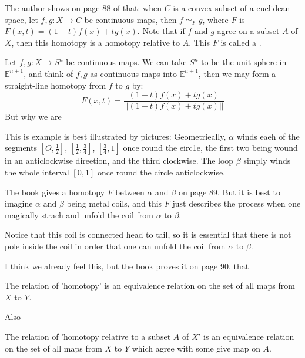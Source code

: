 \begin{ex}
    The author shows on page 88 of \cite{book} that: when $C$ is a
    convex subset of a euclidean space, let $f,g:X\to C$ be continuous
    maps, then $f\simeq_F g$, where $F$ is $F(x,t)=(1-t)f(x)+tg(x)$.
    Note that if $f$ and $g$ agree on a subset $A$ of $X$, then this
    homotopy is a homotopy relative to $A$. This $F$ is called a
    .
\end{ex}
\begin{ex}
    Let $f,g:X\to S^n$ be continuous maps. We can take $S^n$ to be the
    unit sphere in $\mathbb{E}^{n+1}$, and think of $f,g$ as
    continuous maps into $\mathbb{E}^{n+1}$, then we may form a
    straight-line homotopy from $f$ to $g$ by:
    \begin{equation}
        F(x,t) = \frac{(1-t)f(x)+tg(x)}{||(1-t)f(x)+tg(x)||}
    \end{equation}
    But why we are  %
\end{ex}
\begin{ex}
    This is example is best illustrated by pictures:
    Geometrieally, $\alpha$ winds eaeh of the segments
    $[O,\frac{1}{2}]$, $[\frac{1}{2},\frac{3}{4}]$, $[\frac{3}{4}, 1]$
    once round the eirc1e, the first two being wound in an
    anticlockwise direetion, and the third clockwise. The loop $\beta$
    simply winds the whole interval $[0,1]$ once round the circle
    anticlockwise.

    The book\cite{book} gives a homotopy $F$ between $\alpha$ and
    $\beta$ on page 89. But it is best to imagine $\alpha$ and $\beta$
    being metal coils, and this $F$ just describes the process when
    one magically strach and unfold the coil from $\alpha$ to $\beta$.

    Notice that this coil is connected head to tail, so it is
    essential that there is not pole inside the coil in order that one
    can unfold the coil from $\alpha$ to $\beta$.
\end{ex}

I think we already feel this, but the book proves it on page 90, that

\begin{lemma}
    The relation of 'homotopy' is an equivalence relation on the set
    of all maps from $X$ to $Y$.
\end{lemma}

Also
\begin{lemma}
    The relation of 'homotopy relative to a subset $A$ of $X$' is an
    equivalence relation on the set of all maps from $X$ to $Y$ which
    agree with some give map on $A$.
\end{lemma}


